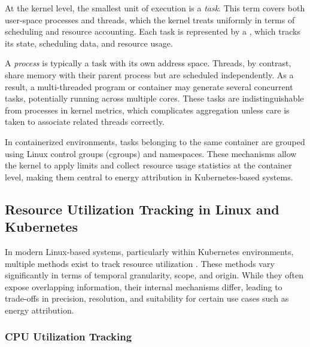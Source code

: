 At the kernel level, the smallest unit of execution is a \emph{task}. This term covers both user-space processes and threads, which the kernel treats uniformly in terms of scheduling and resource accounting. Each task is represented by a , which tracks its state, scheduling data, and resource usage.

A \emph{process} is typically a task with its own address space. Threads, by contrast, share memory with their parent process but are scheduled independently. As a result, a multi-threaded program or container may generate several concurrent tasks, potentially running across multiple cores. These tasks are indistinguishable from processes in kernel metrics, which complicates aggregation unless care is taken to associate related threads correctly.

In containerized environments, tasks belonging to the same container are grouped using Linux control groups (cgroups) and namespaces. These mechanisms allow the kernel to apply limits and collect resource usage statistics at the container level, making them central to energy attribution in Kubernetes-based systems.

\subsection{Resource Utilization Tracking in Linux and Kubernetes}
\label{sec:utilization_tracking}

In modern Linux-based systems, particularly within Kubernetes environments, multiple methods exist to track resource utilization \parencite{kernelprocfs, kernelcgroupv1, kernelcgroupv2, ciliumbpf, cadvisorgithub, metricsservergithub}. These methods vary significantly in terms of temporal granularity, scope, and origin. While they often expose overlapping information, their internal mechanisms differ, leading to trade-offs in precision, resolution, and suitability for certain use cases such as energy attribution.

\subsubsection{CPU Utilization Tracking}

